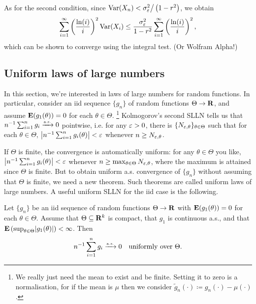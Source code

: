\documentclass[11pt,letterpaper,reqno,oneside]{article}
\begin{document}
\begin{example}[AR(1) model]
	As for the second condition, since $\Var(X_n) < \sigma^2_\eps \big/ \left( 1 - r^2 \right)$, we obtain
	\begin{equation*}
		\sum_{i=1}^\infty \left( \frac{\ln(i)}{i} \right)^2 \Var(X_i) 
		\leq \frac{\sigma^2_\eps}{1-r^2}
		\sum_{i=1}^\infty \left( \frac{\ln(i)}{i} \right)^2 ,
	\end{equation*}
	which can be shown to converge using the integral test. (Or Wolfram Alpha!)
\end{example}



\subsection{Uniform laws of large numbers}
\label{sec:LLNs:ULLNs}

In this section, we're interested in laws of large numbers for random functions. In particular, consider an iid sequence $\{ g_n \}$ of random functions $\Theta \to \R$, and assume $\E(g_1(\theta))=0$ for each $\theta \in \Theta$.%
	\footnote{We really just need the mean to exist and be finite. Setting it to zero is a normalisation, for if the mean is $\mu$ then we consider $\widetilde{g}_n(\cdot) \coloneqq g_n(\cdot) - \mu(\cdot)$.}
Kolmogorov's second SLLN tells us that $n^{-1} \sum_{i=1}^n g_i \convas 0$ pointwise, i.e. for any $\eps>0$, there is $\{ N_{\eps,\theta} \}_{\theta \in \Theta}$ such that for each $\theta \in \Theta$, $\abs*{n^{-1} \sum_{i=1}^n g_i(\theta)} < \eps$ whenever $n \geq N_{\eps,\theta}$.

If $\Theta$ is finite, the convergence is automatically uniform: for any $\theta \in \Theta$ you like, $\abs*{n^{-1} \sum_{i=1}^n g_i(\theta)} < \eps$ whenever $n \geq \max_{\theta \in \Theta} N_{\eps,\theta}$, where the maximum is attained since $\Theta$ is finite. But to obtain uniform a.s. convergence of $\{ g_n \}$ without assuming that $\Theta$ is finite, we need a new theorem. Such theorems are called uniform laws of large numbers. A useful uniform SLLN for the iid case is the following.
%
\begin{theorem}
	\label{theorem:Jennrich_uniform_SLLN}
	Let $\{ g_n \}$ be an iid sequence of random functions $\Theta \to \R$ with $\E(g_1(\theta))=0$ for each $\theta \in \Theta$. Assume that $\Theta \subseteq \R^k$ is compact, that $g_1$ is continuous a.s., and that $\E\left( \sup_{\theta \in \Theta} \abs*{g_1(\theta)} \right) < \infty$. Then
	\begin{equation*}
		n^{-1} \sum_{i=1}^n g_i \convas 0
		\quad\text{uniformly over $\Theta$} .
	\end{equation*}
\end{theorem}
\end{document}
